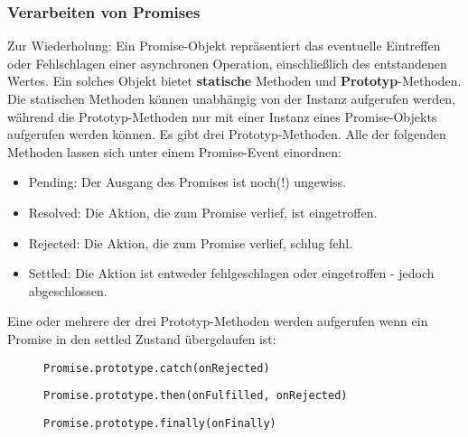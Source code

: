 \subsubsection{Verarbeiten von Promises}

Zur Wiederholung: Ein Promise-Objekt repräsentiert das eventuelle Eintreffen oder Fehlschlagen einer asynchronen Operation, einschließlich des entstandenen Wertes. Ein solches Objekt bietet \textbf{statische} Methoden und \textbf{Prototyp}-Methoden. Die statischen Methoden können unabhängig von der Instanz aufgerufen werden, während die Prototyp-Methoden nur mit einer Instanz eines Promise-Objekts aufgerufen werden können. Es gibt drei Prototyp-Methoden. Alle der folgenden Methoden lassen sich unter einem Promise-Event einordnen:

\begin{itemize} 
\item Pending: Der Ausgang des Promises ist noch(!) ungewiss.
\item Resolved: Die Aktion, die zum Promise verlief, ist eingetroffen.
\item Rejected: Die Aktion, die zum Promise verlief, schlug fehl.
\item Settled: Die Aktion ist entweder fehlgeschlagen oder eingetroffen - jedoch abgeschlossen.
\end{itemize}

\noindent
Eine oder mehrere der drei Prototyp-Methoden werden aufgerufen wenn ein Promise in den settled Zustand übergelaufen ist:

\begin{description}

\begin{figure}[H]
\item \begin{lstlisting}[basicstyle=\small]
Promise.prototype.catch(onRejected)
\end{lstlisting}
\end{figure}

\begin{figure}[H]
\item \begin{lstlisting}[basicstyle=\small]
Promise.prototype.then(onFulfilled, onRejected)
\end{lstlisting}
\end{figure}
 
\begin{figure}[H]
\item \begin{lstlisting}[basicstyle=\small]
Promise.prototype.finally(onFinally)
\end{lstlisting}
\end{figure}
 
\end{description}


